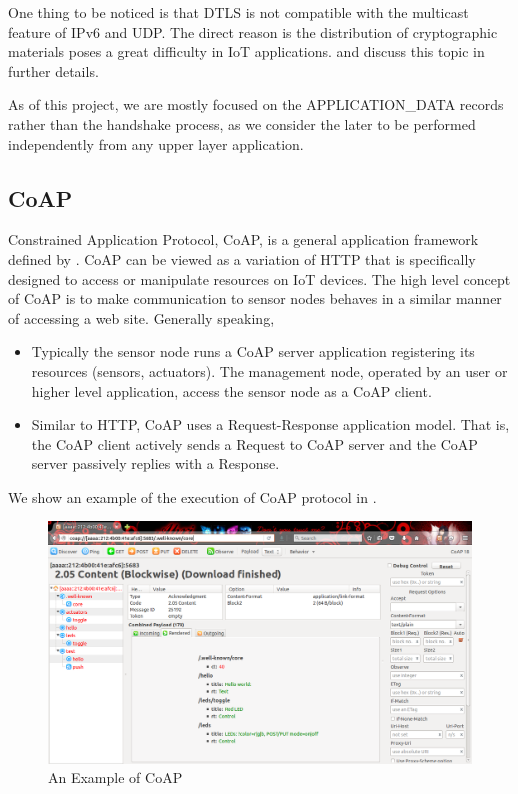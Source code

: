One thing to be noticed is that DTLS is not compatible with the multicast feature of IPv6 and UDP. The direct reason is the distribution of cryptographic materials poses a great difficulty in IoT applications. \cite{DtlsMulticast1} and \cite{DtlsMulticast2} discuss this topic in further details.

As of this project, we are mostly focused on the APPLICATION\_DATA records rather than the handshake process, as we consider the later to be performed independently from any upper layer application.

\subsection{CoAP} \label{Subsec: CoAP}
Constrained Application Protocol, CoAP, is a general application framework defined by \cite{rfc7252}. CoAP can be viewed as a variation of HTTP that is specifically designed to access or manipulate resources on IoT devices. The high level concept of CoAP is to make communication to sensor nodes behaves in a similar manner of accessing a web site. Generally speaking,
\begin{itemize}
	\item Typically the sensor node runs a CoAP server application registering its resources (sensors, actuators). The management node, operated by an user or higher level application, access the sensor node as a CoAP client. 
	\item Similar to HTTP, CoAP uses a Request-Response application model. That is, the CoAP client actively sends a Request to CoAP server and the CoAP server passively replies with a Response.
\end{itemize}

We show an example of the execution of CoAP protocol in .
\begin{figure}[h!]
	\center
	\includegraphics[width=1\textwidth]{fig/CoapExample.png}
	\caption{An Example of CoAP}
	\label{Fig: An Example of CoAP}
\end{figure}

